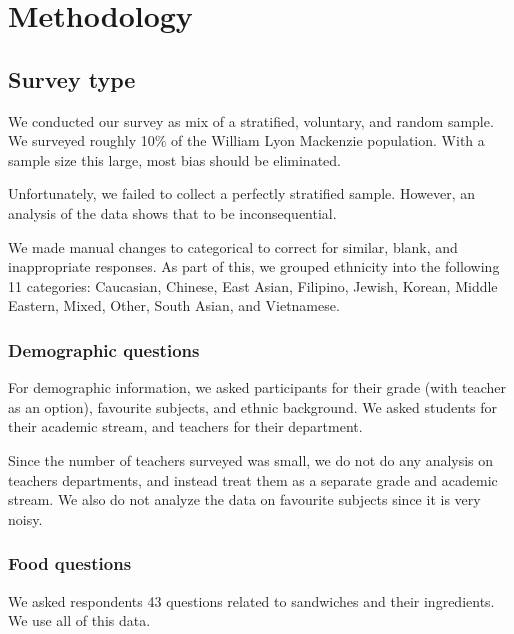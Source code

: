 \chapter{Methodology}

\section{Survey type}
We conducted our survey as mix of a stratified, voluntary, and random sample.
We surveyed roughly 10\% of the William Lyon Mackenzie population.
With a sample size this large, most bias should be eliminated.

Unfortunately, we failed to collect a perfectly stratified sample.
However, an analysis of the data shows that to be inconsequential.

We made manual changes to categorical to correct for similar, blank, and inappropriate responses.
As part of this, we grouped ethnicity into the following 11 categories: Caucasian, Chinese, East Asian, Filipino, Jewish, Korean, Middle Eastern, Mixed, Other, South Asian, and Vietnamese.

\subsection*{Demographic questions}
For demographic information, we asked participants for their grade (with teacher as an option), favourite subjects, and ethnic background.
We asked students for their academic stream, and teachers for their department.

Since the number of teachers surveyed was small, we do not do any analysis on teachers departments, and instead treat them as a separate grade and academic stream.
We also do not analyze the data on favourite subjects since it is very noisy.

\subsection*{Food questions}
We asked respondents 43 questions related to sandwiches and their ingredients.
We use all of this data.
